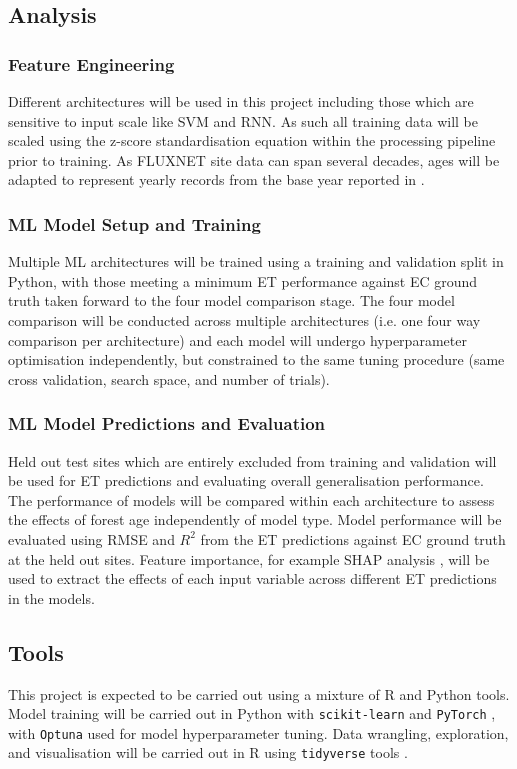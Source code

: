 \documentclass[paper=a4,fontsize=12pt]{scrartcl}
\begin{document}
\subsection{Analysis}
\subsubsection{Feature Engineering}
Different architectures will be used in this project including those which are sensitive to input scale like SVM and RNN. As such all training data will be scaled using the z-score standardisation equation within the processing pipeline prior to training. As FLUXNET site data can span several decades, ages will be adapted to represent yearly records from the base year reported in \textcite{besnard2018quantifying}.

\subsubsection{ML Model Setup and Training}
Multiple ML architectures will be trained using a training and validation split in Python, with those meeting a minimum ET performance against EC ground truth taken forward to the four model comparison stage. The four model comparison will be conducted across multiple architectures (i.e. one four way comparison per architecture) and each model will undergo hyperparameter optimisation independently, but constrained to the same tuning procedure (same cross validation, search space, and number of trials). 

\subsubsection{ML Model Predictions and Evaluation}
Held out test sites which are entirely excluded from training and validation will be used for ET predictions and evaluating overall generalisation performance. The performance of models will be compared within each architecture to assess the effects of forest age independently of model type. Model performance will be evaluated using RMSE and $R^2$ from the ET predictions against EC ground truth at the held out sites. Feature importance, for example SHAP analysis \parencite{lundberg2017unified}, will be used to extract the effects of each input variable across different ET predictions in the models.

\subsection{Tools}
This project is expected to be carried out using a mixture of R and Python tools. Model training will be carried out in Python with \texttt{scikit-learn} \parencite{pedregosa2011scikit} and \texttt{PyTorch} \parencite{paszke2019pytorch}, with \texttt{Optuna} \parencite{akiba2019optuna} used for model hyperparameter tuning. Data wrangling, exploration, and visualisation will be carried out in R using \texttt{tidyverse} tools \parencite{wickham2019welcome}. 
\end{document}
